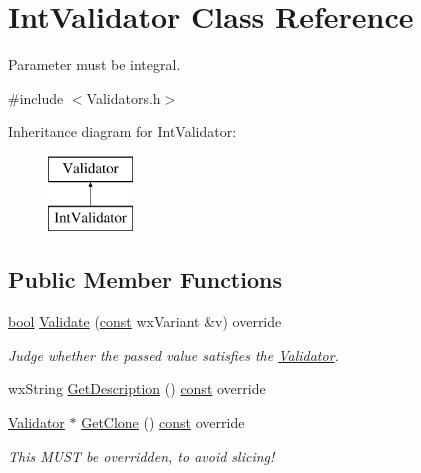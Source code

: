 \hypertarget{class_int_validator}{}\section{Int\+Validator Class Reference}
\label{class_int_validator}


Parameter must be integral.  




{\ttfamily \#include $<$Validators.\+h$>$}

Inheritance diagram for Int\+Validator\+:\begin{figure}[H]
\begin{center}
\leavevmode
\includegraphics[height=2.000000cm]{class_int_validator}
\end{center}
\end{figure}
\subsection*{Public Member Functions}
\begin{DoxyCompactItemize}
\item 
\hyperlink{mac_2config_2i386_2lib-src_2libsoxr_2soxr-config_8h_abb452686968e48b67397da5f97445f5b}{bool} \hyperlink{class_int_validator_a899dfbd29207241b335049444bccbce3}{Validate} (\hyperlink{getopt1_8c_a2c212835823e3c54a8ab6d95c652660e}{const} wx\+Variant \&v) override
\begin{DoxyCompactList}\small\item\em Judge whether the passed value satisfies the \hyperlink{class_validator}{Validator}. \end{DoxyCompactList}\item 
wx\+String \hyperlink{class_int_validator_a7fb6fa74da20e57139f85e0bc9dd79ee}{Get\+Description} () \hyperlink{getopt1_8c_a2c212835823e3c54a8ab6d95c652660e}{const}  override
\item 
\hyperlink{class_validator}{Validator} $\ast$ \hyperlink{class_int_validator_aa92cf5427b93c26c2b1003b7b3fd7d0d}{Get\+Clone} () \hyperlink{getopt1_8c_a2c212835823e3c54a8ab6d95c652660e}{const}  override
\begin{DoxyCompactList}\small\item\em This M\+U\+ST be overridden, to avoid slicing! \end{DoxyCompactList}\end{DoxyCompactItemize}


